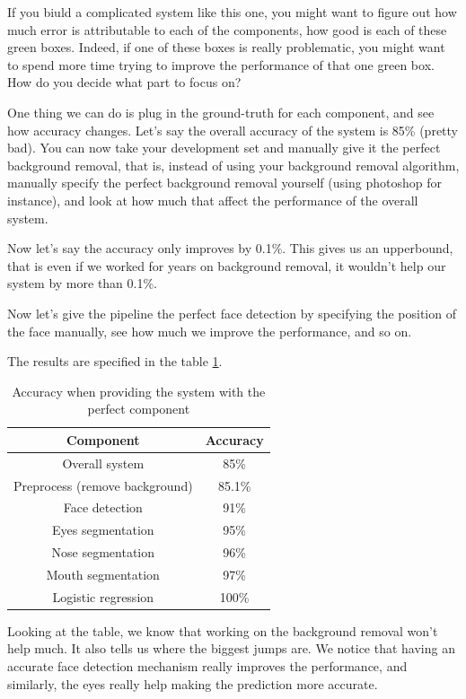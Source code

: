 \documentclass[12pt]{article}
\begin{document}
If you biuld a complicated system like this one, you might want to figure out how much error is attributable to each of the components, how good is each of these green boxes. Indeed, if one of these boxes is really problematic, you might want to spend more time trying to improve the performance of that one green box. How do you decide what part to focus on?

One thing we can do is plug in the ground-truth for each component, and see how accuracy changes. Let's say the overall accuracy of the system is 85\% (pretty bad). You can now take your development set and manually give it the perfect background removal, that is, instead of using your background removal algorithm, manually specify the perfect background removal yourself (using photoshop for instance), and look at how much that affect the performance of the overall system.

Now let's say the accuracy only improves by 0.1\%. This gives us an upperbound, that is even if we worked for years on background removal, it wouldn't help our system by more than 0.1\%.

Now let's give the pipeline the perfect face detection by specifying the position of the face manually, see how much we improve the performance, and so on.

The results are specified in the table \ref{error_analysis}.

\begin{table}[h!]
	\centering
	\begin{tabular}{|c|c|}
		\hline
		\textbf{Component} & \textbf{Accuracy} \\
		\hline
		Overall system & 85\% \\
		\hline
		Preprocess (remove background) & 85.1\% \\
		\hline
		Face detection & 91\% \\
		\hline
		Eyes segmentation & 95\% \\
		\hline
		Nose segmentation & 96\% \\
		\hline
		Mouth segmentation & 97\% \\
		\hline
		Logistic regression & 100\% \\
		\hline
	\end{tabular}
	\caption{Accuracy when providing the system with the perfect component}
	\label{error_analysis}
\end{table}

Looking at the table, we know that working on the background removal won't help much. It also tells us where the biggest jumps are. We notice that having an accurate face detection mechanism really improves the performance, and similarly, the eyes really help making the prediction more accurate.
\end{document}
